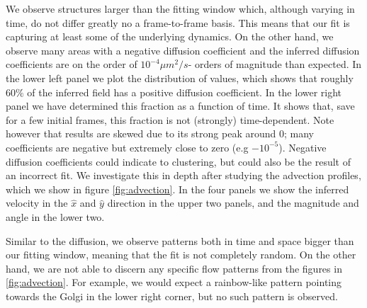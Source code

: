 \documentclass{Dissertate}
\begin{document}
We observe structures larger than the fitting window which, although varying in time, do not differ greatly no a frame-to-frame basis. This means that our fit is capturing at least some of the underlying dynamics. On the other hand, we observe many areas with a negative diffusion coefficient and the inferred diffusion coefficients are on the order of $10^{-4}\mu m^2/s$- orders of magnitude than expected. In the lower left panel we plot the distribution of values, which shows that roughly \(60\%\) of the inferred field has a positive diffusion coefficient. In the lower right panel we have determined this fraction as a function of time. It shows
that, save for a few initial frames, this fraction is not (strongly)
time-dependent. Note however that results are skewed due to its strong peak around 0; many coefficients are negative but extremely close to zero (e.g
\(-10^{-5}\)). Negative diffusion coefficients could indicate to clustering,
but could also be the result of an incorrect fit. We investigate this in
depth after studying the advection profiles, which we show in figure
\ref{fig:advection}. In the four panels we show the inferred
velocity in the \(\hat{x}\) and \(\hat{y}\) direction in the upper two panels, and the magnitude and angle in the lower two.

Similar to the diffusion, we observe patterns both in time and space
bigger than our fitting window, meaning that the fit is not completely
random. On the other hand, we are not able to discern any specific flow patterns from the figures in \ref{fig:advection}. For example, we would expect a rainbow-like pattern pointing towards the Golgi
 in the lower right corner, but no such pattern is observed.
 
\end{document}
